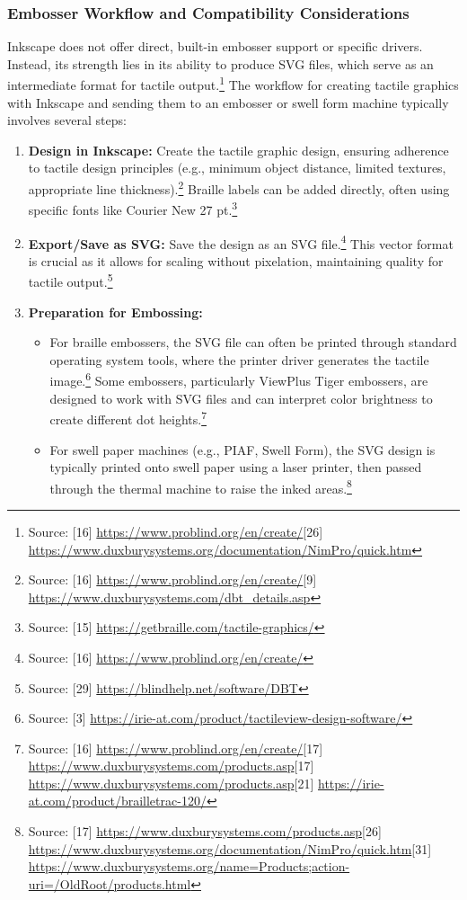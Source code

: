\subsubsection{Embosser Workflow and Compatibility Considerations}

Inkscape does not offer direct, built-in embosser support or specific drivers. Instead, its strength lies in its ability to produce SVG files, which serve as an intermediate format for tactile output.\footnote{Source: [16] \url{https://www.problind.org/en/create/}[26] \url{https://www.duxburysystems.org/documentation/NimPro/quick.htm}} The workflow for creating tactile graphics with Inkscape and sending them to an embosser or swell form machine typically involves several steps:

\begin{enumerate}
    \item \textbf{Design in Inkscape:} Create the tactile graphic design, ensuring adherence to tactile design principles (e.g., minimum object distance, limited textures, appropriate line thickness).\footnote{Source: [16] \url{https://www.problind.org/en/create/}[9] \url{https://www.duxburysystems.com/dbt_details.asp}} Braille labels can be added directly, often using specific fonts like Courier New 27 pt.\footnote{Source: [15] \url{https://getbraille.com/tactile-graphics/}}
    \item \textbf{Export/Save as SVG:} Save the design as an SVG file.\footnote{Source: [16] \url{https://www.problind.org/en/create/}} This vector format is crucial as it allows for scaling without pixelation, maintaining quality for tactile output.\footnote{Source: [29] \url{https://blindhelp.net/software/DBT}}
    \item \textbf{Preparation for Embossing:}
    \begin{itemize}
        \item For braille embossers, the SVG file can often be printed through standard operating system tools, where the printer driver generates the tactile image.\footnote{Source: [3] \url{https://irie-at.com/product/tactileview-design-software/}} Some embossers, particularly ViewPlus Tiger embossers, are designed to work with SVG files and can interpret color brightness to create different dot heights.\footnote{Source: [16] \url{https://www.problind.org/en/create/}[17] \url{https://www.duxburysystems.com/products.asp}[17] \url{https://www.duxburysystems.com/products.asp}[21] \url{https://irie-at.com/product/brailletrac-120/}}
        \item For swell paper machines (e.g., PIAF, Swell Form), the SVG design is typically printed onto swell paper using a laser printer, then passed through the thermal machine to raise the inked areas.\footnote{Source: [17] \url{https://www.duxburysystems.com/products.asp}[26] \url{https://www.duxburysystems.org/documentation/NimPro/quick.htm}[31] \url{https://www.duxburysystems.org/name=Products;action-uri=/OldRoot/products.html}}

\end{itemize}
\end{enumerate}
